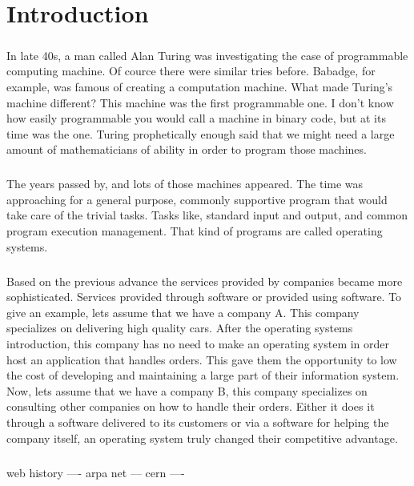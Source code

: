 \chapter{Introduction}

\paragraph{} In late 40s, a man called Alan Turing was investigating the case of programmable computing machine. Of cource there were similar tries before. Babadge, for example, was famous of creating a computation machine. What made Turing's machine different? This machine was the first programmable one. I don't know how easily programmable you would call a machine in binary code, but at its time was the one. Turing prophetically enough said that we might need a large amount of mathematicians of ability in order to program those machines.

\paragraph{} The years passed by, and lots of those machines appeared. The time was approaching for a general purpose, commonly supportive program that would take care of the trivial tasks. Tasks like, standard input and output, and common program execution management. That kind of programs are called operating systems.

\paragraph{} Based on the previous advance the services provided by companies became more sophisticated. Services provided through software or provided using software. To give an example, lets assume that we have a company A. This company specializes on delivering high quality cars. After the operating systems introduction, this company has no need to make an operating system in order host an application that handles orders. This gave them the opportunity to low the cost of developing and maintaining a large part of their information system. Now, lets assume that we have a company B, this company specializes on consulting other companies on how to handle their orders. Either it does it through a software delivered to its customers or via a software for helping the company itself, an operating system truly changed their competitive advantage.


\paragraph{} web history ---- arpa net --- cern ---- 

